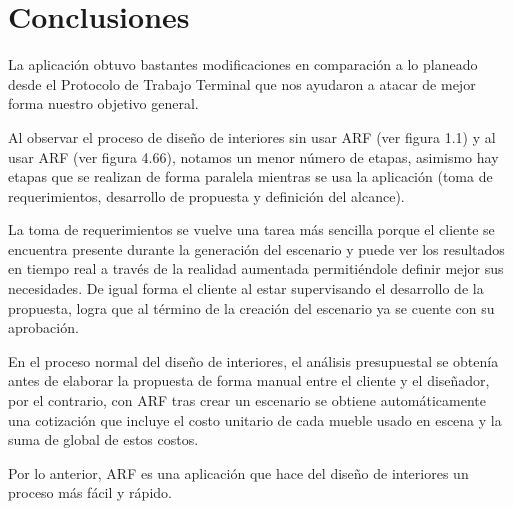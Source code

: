 \chapter{Conclusiones}

La aplicación obtuvo bastantes modificaciones en comparación a lo planeado desde el Protocolo de Trabajo Terminal que nos ayudaron a atacar de mejor forma nuestro objetivo general.\par
Al observar el proceso de diseño de interiores sin usar ARF (ver figura 1.1) y al usar ARF (ver figura 4.66), notamos un menor número de etapas, asimismo hay etapas que se realizan de forma paralela mientras se usa la aplicación (toma de requerimientos, desarrollo de propuesta y definición del alcance).\par
La toma de requerimientos se vuelve una tarea más sencilla porque el cliente se encuentra presente durante la generación del escenario y puede ver los resultados en tiempo real a través de la realidad aumentada permitiéndole definir mejor sus necesidades. De igual forma el cliente al estar supervisando el desarrollo de la propuesta, logra que al término de la creación del escenario ya se cuente con su aprobación.\par
En el proceso normal del diseño de interiores, el análisis presupuestal se obtenía antes de elaborar la propuesta de forma manual entre el cliente y el diseñador, por el contrario, con ARF tras crear un escenario se obtiene automáticamente una cotización que incluye el costo unitario de cada mueble usado en escena y la suma de global de estos costos.\par
Por lo anterior, ARF es una aplicación que hace del diseño de interiores un proceso más fácil y rápido.
